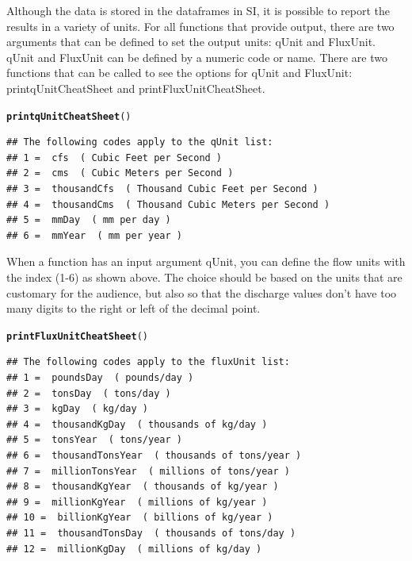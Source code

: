 \documentclass[a4paper,11pt]{article}\usepackage{graphicx, color}
\makeatletter
\newcommand{\hlfunctioncall}[1]{\textcolor[rgb]{0.501960784313725,0,0.329411764705882}{\textbf{#1}}}%
\newenvironment{kframe}{%
 \def\at@end@of@kframe{}%
 \ifinner\ifhmode%
  \def\at@end@of@kframe{\end{minipage}}%
  \begin{minipage}{\columnwidth}%
 \fi\fi%
 \def\FrameCommand##1{\hskip\@totalleftmargin \hskip-\fboxsep
 \colorbox{shadecolor}{##1}\hskip-\fboxsep
     \hskip-\linewidth \hskip-\@totalleftmargin \hskip\columnwidth}%
 \MakeFramed {\advance\hsize-\width
   \@totalleftmargin\z@ \linewidth\hsize
   \@setminipage}}%
 {\par\unskip\endMakeFramed%
 \at@end@of@kframe}
\newenvironment{knitrout}{}{} %
\makeatother
\begin{document}
Although the data is stored in the dataframes in SI, it is possible to report the results in a variety of units. For all functions that provide output, there are two arguments that can be defined to set the output units: qUnit and FluxUnit.  qUnit and FluxUnit can be defined by a numeric code or name.  There are two functions that can be called to see the options for qUnit and FluxUnit: printqUnitCheatSheet and printFluxUnitCheatSheet.


\begin{knitrout}
\color{fgcolor}\begin{kframe}
\begin{alltt}
\hlfunctioncall{printqUnitCheatSheet}()
\end{alltt}
\begin{verbatim}
## The following codes apply to the qUnit list:
## 1 =  cfs  ( Cubic Feet per Second )
## 2 =  cms  ( Cubic Meters per Second )
## 3 =  thousandCfs  ( Thousand Cubic Feet per Second )
## 4 =  thousandCms  ( Thousand Cubic Meters per Second )
## 5 =  mmDay  ( mm per day )
## 6 =  mmYear  ( mm per year )
\end{verbatim}
\end{kframe}
\end{knitrout}


When a function has an input argument qUnit, you can define the flow units with the index (1-6) as shown above. The choice should be based on the units that are customary for the audience, but also so that the discharge values don't have too many digits to the right or left of the decimal point.

\begin{knitrout}
\color{fgcolor}\begin{kframe}
\begin{alltt}
\hlfunctioncall{printFluxUnitCheatSheet}()
\end{alltt}
\begin{verbatim}
## The following codes apply to the fluxUnit list:
## 1 =  poundsDay  ( pounds/day )
## 2 =  tonsDay  ( tons/day )
## 3 =  kgDay  ( kg/day )
## 4 =  thousandKgDay  ( thousands of kg/day )
## 5 =  tonsYear  ( tons/year )
## 6 =  thousandTonsYear  ( thousands of tons/year )
## 7 =  millionTonsYear  ( millions of tons/year )
## 8 =  thousandKgYear  ( thousands of kg/year )
## 9 =  millionKgYear  ( millions of kg/year )
## 10 =  billionKgYear  ( billions of kg/year )
## 11 =  thousandTonsDay  ( thousands of tons/day )
## 12 =  millionKgDay  ( millions of kg/day )
\end{verbatim}
\end{kframe}
\end{knitrout}
\end{document}

